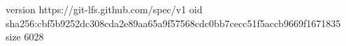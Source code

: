 version https://git-lfs.github.com/spec/v1
oid sha256:cbf5b9252dc308cda2e89aa65a9f57568cdc0bb7cecc51f5accb9669f1671835
size 6028
